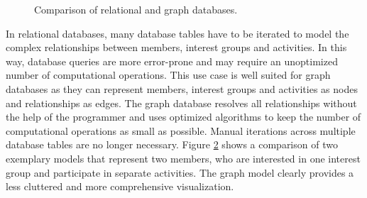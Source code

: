 \documentclass[12pt,numbers=noenddot,parskip,bibliography=totocnumbered,listof=totocnumbered,draft]{scrreprt}
\begin{document}
\begin{figure}
\bigskip

\begin{subfigure}[b]{\textwidth}%
\centering
{}
\caption{}
\label{graph database}
\end{subfigure}%
\caption[Comparison of relational and graph databases]{Comparison of relational and graph databases.}
\label{databases}
\end{figure}

In relational databases, many database tables have to be iterated to model the complex relationships between members, interest groups and activities. In this way, database queries are more error-prone and may require an unoptimized number of computational operations.
This use case is well suited for graph databases as they can represent members, interest groups and activities as nodes and relationships as edges. The graph database resolves all relationships without the help of the programmer and uses optimized algorithms to keep the number of computational operations as small as possible. Manual iterations across multiple database tables are no longer necessary. Figure \ref{databases} shows a comparison of two exemplary models that represent two members, who are interested in one interest group and participate in separate activities. The graph model clearly provides a less cluttered and more comprehensive visualization.
\end{document}
